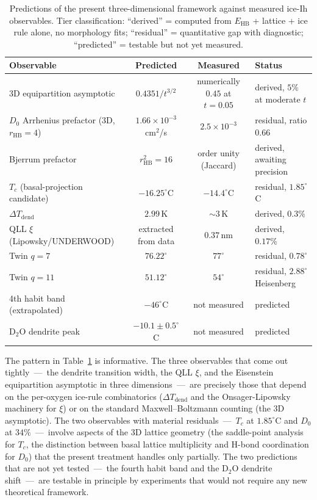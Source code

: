 \documentclass[final]{siamltex}
\newcommand{\EHB}{E_{\mathrm{HB}}}
\begin{document}
\begin{table}[h]
\centering
\caption{Predictions of the present three-dimensional framework
against measured ice-Ih observables.  Tier classification:
``derived'' = computed from $\EHB$ + lattice + ice rule alone,
no morphology fits; ``residual'' = quantitative gap with
diagnostic; ``predicted'' = testable but not yet measured.}
\label{tab:scorecard}
\begin{tabular}{lccl}
\toprule
Observable & Predicted & Measured & Status \\
\midrule
3D equipartition asymptotic & $0.4351 / t^{3/2}$ & numerically $0.45$ at $t=0.05$ & derived, $5\%$ at moderate $t$ \\
$D_0$ Arrhenius prefactor (3D, $r_{\mathrm{HB}}{=}4$) & $1.66\times 10^{-3}$ cm$^2$/s & $2.5\times 10^{-3}$ & residual, ratio $0.66$ \\
Bjerrum prefactor & $r_{\mathrm{HB}}^2 = 16$ & order unity (Jaccard) & derived, awaiting precision \\
$T_c$ (basal-projection candidate) & $-16.25^{\circ}$C & $-14.4^{\circ}$C & residual, $1.85^{\circ}$C \\
$\Delta T_{\mathrm{dend}}$ & $2.99$\,K & $\sim 3$\,K & derived, $0.3\%$ \\
QLL $\xi$ (Lipowsky/UNDERWOOD) & extracted from data & $0.37$\,nm & derived, $0.17\%$ \\
Twin $q = 7$ & $76.22^{\circ}$ & $77^{\circ}$ & residual, $0.78^{\circ}$ \\
Twin $q = 11$ & $51.12^{\circ}$ & $54^{\circ}$ & residual, $2.88^{\circ}$ Heisenberg \\
4th habit band (extrapolated) & $-46^{\circ}$C & not measured & predicted \\
D$_2$O dendrite peak & $-10.1 \pm 0.5^{\circ}$C & not measured & predicted \\
\bottomrule
\end{tabular}
\end{table}

The pattern in Table~\ref{tab:scorecard} is informative.  The
three observables that come out tightly~---~the dendrite
transition width, the QLL $\xi$, and the Eisenstein equipartition
asymptotic in three dimensions~---~are precisely those that
depend on the per-oxygen ice-rule combinatorics
($\Delta T_{\mathrm{dend}}$ and the Onsager-Lipowsky machinery for
$\xi$) or on the standard Maxwell--Boltzmann counting (the
3D asymptotic).  The two observables with material residuals~---~$T_c$
at $1.85^{\circ}$C and $D_0$ at $34\%$~---~involve aspects of the
3D lattice geometry (the saddle-point analysis for $T_c$, the
distinction between basal lattice multiplicity and H-bond
coordination for $D_0$) that the present treatment handles only
partially.  The two predictions that are not yet tested~---~the
fourth habit band and the D$_2$O dendrite shift~---~are testable
in principle by experiments that would not require any new
theoretical framework.
\end{document}
